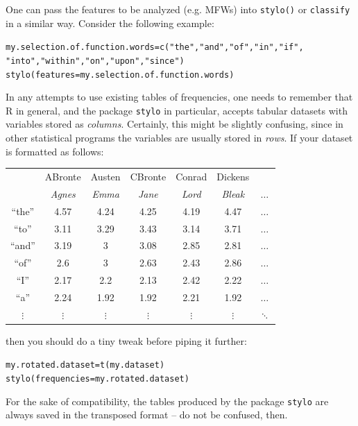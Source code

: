 \documentclass[11pt,a4paper]{article}
\def\code#1{{\tt #1}}
\begin{document}
One can pass the features to be analyzed (e.g. MFWs) into \code{stylo()} or \code{classify} in a similar way. Consider the following example:

\begin{alltt}
     my.selection.of.function.words = c("the", "and", "of", "in", "if", 
                               "into", "within", "on", "upon", "since")
     stylo(features = my.selection.of.function.words)
\end{alltt}

In any attempts to use existing tables of frequencies, one needs to remember that R in general, and the package \code{stylo} in particular, accepts tabular datasets with variables stored as \textit{columns}. Certainly, this might be slightly confusing, since in other statistical programs the variables are usually stored in \textit{rows}. If your dataset is formatted as follows:

\begin{center}
\begin{tabular}{c|cccccc}
 & ABronte & Austen & CBronte & Conrad & Dickens &  \\
 & {\it Agnes} & {\it Emma} & {\it Jane} & {\it Lord} & {\it Bleak} & $\dots$\\
\hline
“the”	& 4.57	& 4.24	& 4.25	& 4.19	& 4.47  & $\dots$\\
“to”	& 3.11	& 3.29	& 3.43	& 3.14	& 3.71  & $\dots$\\
“and”	& 3.19	& 3	    & 3.08	& 2.85	& 2.81  & $\dots$\\
“of”	& 2.6	& 3	    & 2.63	& 2.43	& 2.86  & $\dots$\\
“I”    & 2.17	& 2.2	& 2.13	& 2.42	& 2.22  & $\dots$\\
“a”    & 2.24	& 1.92	& 1.92	& 2.21	& 1.92  & $\dots$\\
$\vdots$ & $\vdots$ & $\vdots$ & $\vdots$ & $\vdots$ & 
$\vdots$ & $\ddots$ 
\end{tabular}
\end{center}

\noindent
then you should do a tiny tweak before piping it further:

\begin{alltt}
    my.rotated.dataset = t(my.dataset)
    stylo(frequencies = my.rotated.dataset)
\end{alltt}

\noindent
For the sake of compatibility, the tables produced by the package \code{stylo} are always saved in the transposed format -- do not be confused, then.
\end{document}
